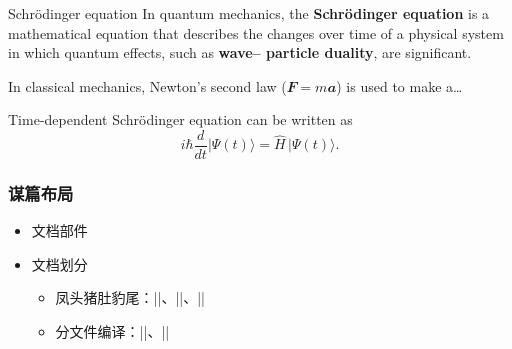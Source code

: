 \begin{frame}{Schrödinger equation}
In quantum mechanics, the \textbf{Schr\"odinger equation} is a
mathematical equation that describes the changes over time of a
physical system in which quantum effects, such as \textbf{wave--%
particle duality}, are significant.

In classical mechanics, Newton's second law
($\mathbfit{F}=m\mathbfit{a}$) is used to make a\ldots{}

Time-dependent Schrödinger equation can be written as
\[ i\hbar \frac{d}{dt} \vert\Psi(t)\rangle = \hat{H} \, \vert\Psi(t)\rangle. \]
\end{frame}

\begin{frame}[fragile]
\frametitle{谋篇布局}
\begin{itemize}
  \item 文档部件
  \item 文档划分
    \begin{itemize}
      \item 凤头猪肚豹尾：|\frontmatter|、|\mainmatter|、|\backmatter|
      \item 分文件编译：||、||
    \end{itemize}
\end{itemize}
\end{frame}

